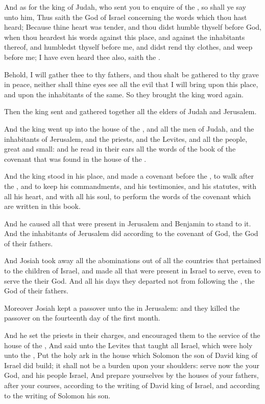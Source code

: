 \Verse And as for the king of Judah, who sent you to enquire of the \LORD, so shall ye say unto him, Thus saith the \LORD God of Israel concerning the words which thou hast heard; \Verse Because thine heart was tender, and thou didst humble thyself before God, when thou heardest his words against this place, and against the inhabitants thereof, and humbledst thyself before me, and didst rend thy clothes, and weep before me; I have even heard thee also, saith the \LORD.

\Verse Behold, I will gather thee to thy fathers, and thou shalt be gathered to thy grave in peace, neither shall thine eyes see all the evil that I will bring upon this place, and upon the inhabitants of the same. So they brought the king word again.

\Verse Then the king sent and gathered together all the elders of Judah and Jerusalem.

\Verse And the king went up into the house of the \LORD, and all the men of Judah, and the inhabitants of Jerusalem, and the priests, and the Levites, and all the people, great and small: and he read in their ears all the words of the book of the covenant that was found in the house of the \LORD.

\Verse And the king stood in his place, and made a covenant before the \LORD, to walk after the \LORD, and to keep his commandments, and his testimonies, and his statutes, with all his heart, and with all his soul, to perform the words of the covenant which are written in this book.

\Verse And he caused all that were present in Jerusalem and Benjamin to stand to it. And the inhabitants of Jerusalem did according to the covenant of God, the God of their fathers.

\Verse And Josiah took away all the abominations out of all the countries that pertained to the children of Israel, and made all that were present in Israel to serve, even to serve the \LORD their God. And all his days they departed not from following the \LORD, the God of their fathers.


\Chapter
\Verse Moreover Josiah kept a passover unto the \LORD in Jerusalem: and they killed the passover on the fourteenth day of the first month.

\Verse And he set the priests in their charges, and encouraged them to the service of the house of the \LORD, \Verse And said unto the Levites that taught all Israel, which were holy unto the \LORD, Put the holy ark in the house which Solomon the son of David king of Israel did build; it shall not be a burden upon your shoulders: serve now the \LORD your God, and his people Israel, \Verse And prepare yourselves by the houses of your fathers, after your courses, according to the writing of David king of Israel, and according to the writing of Solomon his son.

